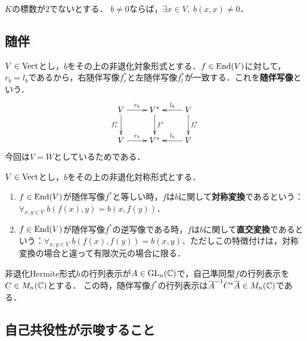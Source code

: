 \documentclass[uplatex,dvipdfmx]{jsreport}
\begin{document}
\begin{lemma}
    $K$の標数が$2$でないとする．
    $b\ne 0$ならば，$\exists x\in V,\;b(x,x)\ne 0$．
\end{lemma}

\subsection{随伴}

\begin{definition}
    $V\in\mathrm{Vect}$とし，$b$をその上の非退化対象形式とする．$f\in\mathrm{End}(V)$に対して，
    $r_b=l_b$であるから，右随伴写像$f^*_r$と左随伴写像$f^*_l$が一致する．これを\textbf{随伴写像}という．
    \[\xymatrix{
        V\ar[r]^-{r_b}\ar[d]_-{f_r^*}&V^*\ar[d]^-{f^*}&V\ar[l]_-{l_b}\ar[d]^-{f^*_l}\\
        V\ar[r]^-{r_b}&V^*&V\ar[l]_-{l_b}
    }\]
    今回は$V=W$としているためである．
\end{definition}

\begin{definition}
    $V\in\mathrm{Vect}$とし，$b$をその上の非退化対称形式とする．
    \begin{enumerate}
        \item $f\in\mathrm{End}(V)$が随伴写像$f^*$と等しい時，$f$は$b$に関して\textbf{対称変換}であるという：$\forall_{x,y\in V}\;b(f(x),y)=b(x,f(y))$．
        \item $f\in\mathrm{End}(V)$が随伴写像$f^*$の逆写像である時，$f$は$b$に関して\textbf{直交変換}であるという：$\forall_{x,y\in V}\;b(f(x),f(y))=b(x,y)$．ただしこの特徴付けは，対称変換の場合と違って有限次元の場合に限る．
    \end{enumerate}
\end{definition}

\begin{remark}[随伴写像の行列表示]
    非退化Hermite形式$h$の行列表示が$A\in\mathrm{GL}_n(\mathbb{C})$で，自己準同型$f$の行列表示を$C\in M_n(\mathbb{C})$とする．
    この時，随伴写像$f^*$の行列表示は$\overline{A}^{-1}C^*\overline{A}\in M_n(\mathbb{C})$である．
\end{remark}

\subsection{自己共役性が示唆すること}
\end{document}
